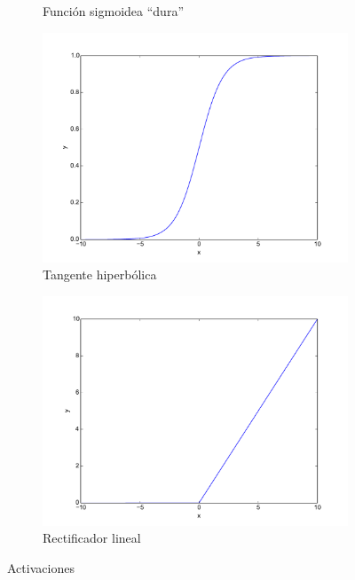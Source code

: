 \begin{figure}[tbh]
\begin{subfigure}[b]{0.5\textwidth}
		\caption{Función sigmoidea ``dura''}
		\label{fig:metodos/hard-sigmoid}
	\end{subfigure}
	\begin{subfigure}[b]{0.5\textwidth}
		\centering
		\includegraphics[width=\linewidth]{imagenes/metodos/sigmoid.pdf}
		\caption{Tangente hiperbólica}
		\label{fig:metodos/tanh}
	\end{subfigure}
	\begin{subfigure}[b]{0.5\textwidth}
		\centering
		\includegraphics[width=\linewidth]{imagenes/metodos/relu.pdf}
		\caption{Rectificador lineal}
		\label{fig:metodos/relu}
	\end{subfigure}
	\caption{Activaciones}
	\label{fig:metodos/activations}
\end{figure}

